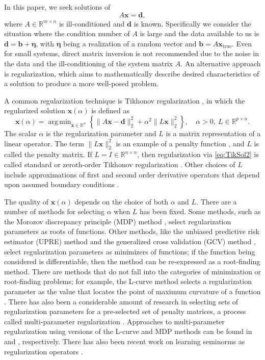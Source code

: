 \documentclass[12pt]{article}
\newcommand{\bVec}{\mathbf{b}}	%
\newcommand{\dVec}{\mathbf{d}}	%
\newcommand{\xVec}{\mathbf{x}}	%
\newcommand{\xTrue}{\mathbf{x}_{\text{true}}}	%
\newcommand{\regparam}{\alpha}
\newcommand{\xReg}{\xVec(\regparam)}	%
\DeclareMathOperator*{\argmin}{arg\,min}
\newcommand{\noise}{\eta}	%
\newcommand{\noiseVec}{\bm{\noise}}	%
\begin{document}
In this paper, we seek solutions of 
\begin{equation}
\label{eq:Ax = b}
A\xVec = \dVec,
\end{equation}
where $A \in \mathbb{R}^{m \times n}$ is ill-conditioned and $\dVec$ is known. Specifically we consider the situation where the condition number of $A$ is large and the data available to us is $\dVec = \bVec + \noiseVec$, with $\noiseVec$ being a realization of a random vector and $\bVec = A\xTrue$. Even for small systems, direct matrix inversion is not recommended due to the noise in the data and the ill-conditioning of the system matrix $A$. An alternative approach is regularization, which aims to mathematically describe desired characteristics of a solution to produce a more well-posed problem. \par
A common regularization technique is Tikhonov regularization \cite{Tikh1963}, in which the regularized solution $\xReg$ is defined as
\begin{equation}
\label{eq:TikSol2}
\xVec(\regparam) = \argmin_{\xVec \in \mathbb{R}^n} \left\{\|A\xVec - \dVec\|_2^2 + \regparam^2\|L\xVec\|_2^2\right\}, \quad \regparam > 0, ~ L \in \mathbb{R}^{p \times n}.
\end{equation}
The scalar $\regparam$ is the regularization parameter and $L$ is a matrix representation of a linear operator. The term $\|L\xVec\|_2^2$ is an example of a penalty function \cite{Vogel:2002}, and $L$ is called the penalty matrix. If $L = I \in \mathbb{R}^{n \times n}$, then regularization via \eqref{eq:TikSol2} is called standard or zeroth-order Tikhonov regularization \cite{ABT}. Other choices of $L$ include approximations of first and second order derivative operators that depend upon assumed boundary conditions \cite{NeumannDCT,Strang1999,Vogel:2002}. \par 
The quality of $\xReg$ depends on the choice of both $\regparam$ and $L$. There are a number of methods for selecting $\regparam$ when $L$ has been fixed. Some methods, such as the Morozov discrepancy principle (MDP) method \cite{Morozov1966}, select regularization parameters as roots of functions. Other methods, like the unbiased predictive risk estimator (UPRE) method \cite{Mallows1973} and the generalized cross validation (GCV) method \cite{Wahba1977,Wahba1990}, select regularization parameters as minimizers of functions; if the function being considered is differentiable, then the method can be re-expressed as a root-finding method. There are methods that do not fall into the categories of minimization or root-finding problems; for example, the L-curve method selects a regularization parameter as the value that locates the point of maximum curvature of a function \cite{Hansen1992,HansenOLeary}. There has also been a considerable amount of research in selecting sets of regularization parameters for a pre-selected set of penalty matrices, a process called multi-parameter regularization \cite{Brezinski2003,ChungEspanol2017,GazzolaNovati2013,LuPereverzev2011,Wood2002}. Approaches to multi-parameter regularization using versions of the L-curve and MDP methods can be found in \cite{BelgeKilmerMiller2002} and \cite{Wang2012}, respectively. There has also been recent work on learning seminorms as regularization operators \cite{Holler2020LearningNR}. \par 
\end{document}
